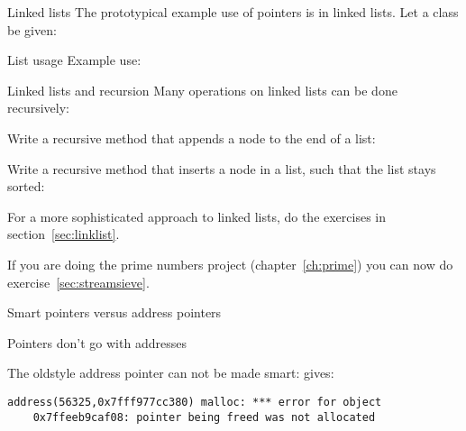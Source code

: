 \begin{block}{Linked lists}
  \label{sl:linkedlistimpl}
  The prototypical example use of pointers is in linked lists. Let a
  class  be given:
  \begin{multicols}{2}
    \columnbreak
    \vfill\hbox{}
  \end{multicols}
\end{block}

\begin{block}{List usage}
\label{sl:linkedlistuse}
  Example use:
\end{block}

\begin{block}{Linked lists and recursion}
  \label{sl:linkedlistrecursive}
  Many operations on linked lists can be done recursively:
\end{block}

\begin{exercise}
  \label{ex:linkedlist1}
  Write a recursive  method that appends a node to the end
  of a list:
\end{exercise}

\begin{exercise}
  \label{ex:linkedlist2}
  Write a recursive  method that inserts a node in a list, such that
  the list stays sorted:
\end{exercise}

\begin{exercise}
  \label{ex:linkedlist3}
  For a more sophisticated approach to linked lists, do the exercises
  in section~\ref{sec:linklist}.
\end{exercise}

\begin{exercise}
  If you are doing the prime numbers project (chapter~\ref{ch:prime})
  you can now do exercise~\ref{sec:streamsieve}.
\end{exercise}

 {Smart pointers versus address pointers}

\begin{block}{Pointers don't go with addresses}
  \label{sl:shareaddress}

  The oldstyle  address pointer can not be made smart:
  gives:
\begin{verbatim}
address(56325,0x7fff977cc380) malloc: *** error for object
    0x7ffeeb9caf08: pointer being freed was not allocated
\end{verbatim}
\end{block}


